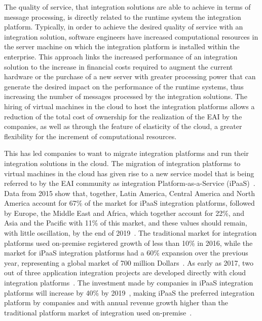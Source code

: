 The quality of service, that integration solutions are able to achieve in terms of message processing, is directly related to the runtime system the integration platform. Typically, in order to achieve the desired quality of service with an integration solution, software engineers have increased computational resources in the server machine on which the integration platform is installed within the enterprise. This approach links the increased performance of an integration solution to the increase in financial costs required to augment the current hardware or the purchase of a new server with greater processing power that can generate the desired impact on the performance of the runtime systems, thus increasing the number of messages processed by the integration solutions.
The hiring of virtual machines in the cloud to host the integration platforms allows a reduction of the total cost of ownership for the realization of the EAI by the companies, as well as through the feature of elasticity of the cloud, a greater flexibility for the increment of computational resources.

This has led companies to want to migrate integration platforms and run their integration solutions in the cloud. The migration of integration platforms to virtual machines in the cloud has given rise to a new service model that is being referred to by the EAI community as integration Platform-as-a-Service (iPaaS)~\cite{pezzini2011}. Data from 2015 show that, together, Latin America, Central America and North America account for 67\% of the market for iPaaS integration platforms, followed by Europe, the Middle East and Africa, which together account for 22\%, and Asia and the Pacific with 11\% of this market, and these values should remain, with little oscillation, by the end of 2019~\cite{sharma2015}. The traditional market for integration platforms used on-premise registered growth of less than 10\% in 2016, while the market for iPaaS integration platforms had a 60\% expansion over the previous year, representing a global market of 700 million Dollars~\cite{guttridge2017}. As early as 2017, two out of three application integration projects are developed directly with cloud integration platforms~\cite{pezzini2015}. The investment made by companies in iPaaS integration platforms will increase by 40\% by 2019~\cite{sharma2015}, making iPaaS the preferred integration platform by companies and with annual revenue growth higher than the traditional platform market of integration used on-premise~\cite{guttridge2017,sharma2017}.

